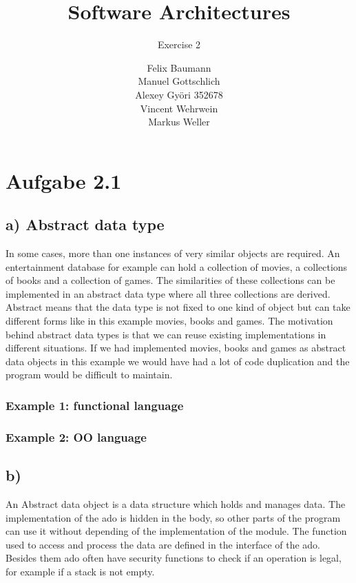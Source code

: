\documentclass[a4paper,10pt]{scrartcl}[2003/01/01]
\title{Software Architectures}
\subtitle{Exercise 2}
\author{ Felix Baumann \\ Manuel Gottschlich \\  Alexey Gy\"ori 352678 \\ Vincent Wehrwein \\ Markus Weller}
\begin{document}
    \maketitle
    
    \section*{Aufgabe 2.1}
    \subsection*{a) Abstract data type}
    In some cases, more than one instances of very similar objects are required. An  entertainment database for example can hold a collection of movies, a collections of books and a collection of games. The similarities of these collections can be implemented in an abstract data type where all three collections are derived. Abstract means that the data type is not fixed to one kind of object but can take different forms like in this example movies, books and games. The motivation behind abstract data types is that we can reuse existing implementations in different situations. If we had implemented movies, books and games as abstract data objects in this example we would have had a lot of code duplication and the program would be difficult to maintain.
    
    \subsubsection*{Example 1: functional language}
    
    
    \subsubsection*{Example 2: OO language}
    
    
    
    \subsection*{b)}
    An Abstract data object is a data structure which holds and manages data. The implementation of the ado is hidden in the body, so other parts of the program can use it without depending of the implementation of the module. The function used to access and process the data are defined in the interface of the ado. Besides them ado often have security functions to check if an operation is legal, for example if a stack is not empty. 
    
\end{document}
